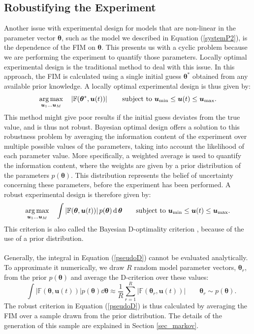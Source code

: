 \subsection{Robustifying the Experiment}
Another issue with experimental design for models that are non-linear in the parameter vector $\bm \theta$, such as the model we described in Equation (\ref{systemP2}), is the dependence of the FIM on $\bm \theta$. This presents us with a cyclic problem because we are performing the experiment to quantify those parameters. Locally optimal experimental design is the traditional method to deal with this issue. In this approach, the FIM is calculated using a single initial guess $\bm \theta^*$ obtained from any available prior knowledge. A locally optimal experimental design is thus given by:
\begin{equation}
\operatorname*{arg\,max}_{\bm u_1 \ldots \bm u_M} \quad \left | \mathbb{F}(\bm \theta^*, \bm u(t)) \right |
\qquad \text{subject to } \bm u_{\min} \leq \bm u(t) \leq \bm u_{\max}.
\label{localD}
\end{equation}
This method might give poor results if the initial guess deviates from the true value, and is thus not robust. Bayesian optimal design offers a solution to this robustness problem by averaging the information content of the experiment over multiple possible values of the parameters, taking into account the likelihood of each parameter value. More specifically, a weighted average is used to quantify the information content, where the weights are given by a prior distribution of the parameters $p(\bm \theta)$. This distribution represents the belief of uncertainty concerning these parameters, before the experiment has been performed. A robust experimental design is therefore given by:
\begin{equation}
\operatorname*{arg\,max}_{\bm u_1 \ldots \bm u_M} \quad \int \left | \mathbb{F}(\bm \theta, \bm u(t)) \right | p(\bm \theta) \operatorname{\mathrm{d}} \bm \theta
\qquad \text{subject to } \bm u_{\min} \leq \bm u(t) \leq \bm u_{\max}.
\label{pseudoD}
\end{equation}
This criterion is also called the Bayesian D-optimality criterion \parencite{chaloner}, because of the use of a prior distribution.
\\
\\
Generally, the integral in Equation (\ref{pseudoD}) cannot be evaluated analytically. To approximate it numerically, we draw $R$ random model parameter vectors, $\bm \theta_r$, from the prior $p(\bm \theta)$ and average the D-criterion over these values:
\begin{equation}
\label{pseudoDcalc}
\quad \int \left | \mathbb{F}(\bm \theta, \bm u(t)) \right | p(\bm \theta) \dd \bm \theta
\approx \frac{1}{R} \sum_{r=1}^{R} \left | \mathbb{F}(\bm \theta_{r}, \bm u(t)) \right |
\qquad   \bm \theta_r \sim p(\bm \theta).
\end{equation}
The robust criterion in Equation (\ref{pseudoD}) is thus calculated by averaging the FIM over a sample drawn from the prior distribution. The details of the generation of this sample are explained in Section \ref{sec_markov}. 
